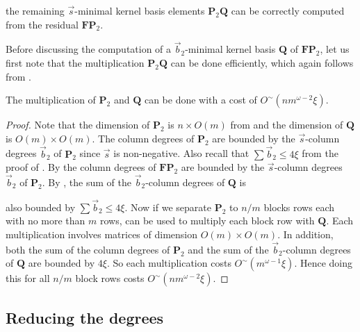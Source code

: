 the remaining $\vec{s}$-minimal kernel basis elements $\mathbf{P}_{2}\mathbf{Q}$
can be correctly computed from the residual $\mathbf{F}\mathbf{P}_{2}$.
\begin{comment}
We still need to show it can be done efficiently. 
\end{comment}
{} Before discussing the computation of a $\vec{b}_{2}$-minimal kernel
basis $\mathbf{Q}$ of $\mathbf{F}\mathbf{P}_{2}$, let us first note
that the multiplication $\mathbf{P}_{2}\mathbf{Q}$ can be done efficiently,
which again follows from . 
\begin{lem}
\label{lem:multiplyingP2Q}The multiplication of $\mathbf{P}_{2}$
and $\mathbf{Q}$ can be done with a cost of $O^{\sim}\left(nm^{\omega-2}\xi\right)$.\end{lem}
\begin{proof}
Note that the dimension of $\mathbf{P}_{2}$ is $n\times O(m)$ from
 and
the dimension of $\mathbf{Q}$ is $O\left(m\right)\times O\left(m\right)$.
The column degrees of $\mathbf{P}_{2}$ are bounded by the $\vec{s}$-column
degrees $\vec{b}_{2}$ of $\mathbf{P}_{2}$ since $\vec{s}$ is non-negative.
Also recall that $\sum\vec{b}_{2}\le4\xi$ from the proof of .
By  the column degrees of $\mathbf{F}\mathbf{P}_{2}$
are bounded by the $\vec{s}$-column degrees $\vec{b}_{2}$ of $\mathbf{P}_{2}$.
By , the sum
of the $\vec{b}_{2}$-column degrees of $\mathbf{Q}$ is %
\begin{comment}
bounded by the sum of the column degrees of $\mathbf{F}\mathbf{P}_{2}$,
which is 
\end{comment}
{} also bounded by $\sum\vec{b}_{2}\le4\xi$. Now if we separate $\mathbf{P}_{2}$
to $n/m$ blocks rows each with no more than $m$ rows, 
can be used to multiply each block row with $\mathbf{Q}$. Each multiplication
involves matrices of dimension $O\left(m\right)\times O\left(m\right)$.
In addition, both the sum of the column degrees of $\mathbf{P}_{2}$
and the sum of the $\vec{b}_{2}$-column degrees of $\mathbf{Q}$
are bounded by $4\xi$. So each multiplication costs $O^{\sim}(m^{\omega-1}\xi)$.
Hence doing this for all $n/m$ block rows costs $O^{\sim}\left(nm^{\omega-2}\xi\right)$. 
\end{proof}

\subsection{Reducing the degrees}

